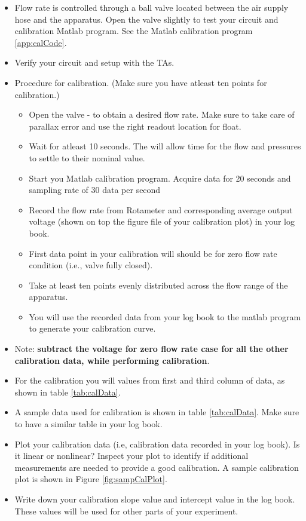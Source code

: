 \documentclass{article} %
\begin{document}
\begin{itemize}
\item Flow rate is controlled through a ball valve located between the air supply hose and the apparatus. Open the valve slightly to test your circuit and calibration Matlab program. See the Matlab calibration program \ref{app:calCode}.
\item Verify your circuit and setup with the TAs.
\item Procedure for calibration. (Make sure you have atleast ten points for calibration.)
\begin{itemize}
\item Open the valve - to obtain a desired flow rate. Make sure to take care of parallax error and use the right readout location for float.
\item Wait for atleast 10 seconds. The will allow time for the flow and pressures to settle to their nominal value.
\item Start you Matlab calibration program. Acquire data for 20 seconds and sampling rate of 30 data per second
\item Record the flow rate from Rotameter and corresponding average output voltage (shown on top the figure file of your calibration plot) in your log book.
\item First data point in your calibration will should be for zero flow rate condition (i.e., valve fully closed).
\item Take at least ten points evenly distributed across the flow range of the apparatus.
\item You will use the recorded  data from your log book to the matlab program to generate your calibration curve.
\end{itemize}
\item Note: {\bf subtract the voltage for zero flow rate case for all the other calibration data, while performing calibration}.
\item For the calibration you will values from first and third column of data, as shown in table \ref{tab:calData}.
\item A sample data used for calibration is shown in table \ref{tab:calData}. Make sure to have a similar table in your log book.
\item Plot your calibration data (i.e, calibration data recorded in your log book).  Is it linear or nonlinear?  Inspect your plot to identify if additional measurements are needed to provide a good calibration. A sample calibration plot is shown in Figure \ref{fig:sampCalPlot}.
\item Write down your calibration slope value and intercept value in the log book. These values will be used for other parts of your experiment.
\end{itemize}
\end{document}
